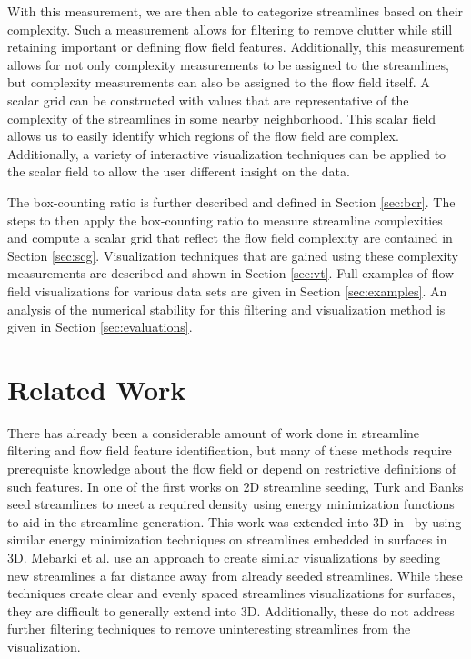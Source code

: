 \documentclass{egpubl}
\begin{document}
With this measurement, we are then able to categorize streamlines based on their complexity.
Such a measurement allows for filtering to remove clutter while still retaining important or defining flow field features.
Additionally, this measurement allows for not only complexity measurements to be assigned to the streamlines, but complexity measurements can also be assigned to the flow field itself.
A scalar grid can be constructed with values that are representative of the complexity of the streamlines in some nearby neighborhood.
This scalar field allows us to easily identify which regions of the flow field are complex.
Additionally, a variety of interactive visualization techniques can be applied to the scalar field to allow the user different insight on the data.

The box-counting ratio is further described and defined in Section \ref{sec:bcr}.
The steps to then apply the box-counting ratio to measure streamline complexities and compute a scalar grid that reflect the flow field complexity are contained in Section \ref{sec:scg}.
Visualization techniques that are gained using these complexity measurements are described and shown in Section \ref{sec:vt}.
Full examples of flow field visualizations for various data sets are given in Section \ref{sec:examples}.
An analysis of the numerical stability for this filtering and visualization method is given in Section \ref{sec:evaluations}.

\section{Related Work}

There has already been a considerable amount of work done in streamline filtering and flow field feature identification, but many of these methods require prerequiste knowledge about the flow field or depend on restrictive definitions of such features.
In one of the first works on 2D streamline seeding, Turk and Banks \cite{turk} seed streamlines to meet a required density using energy minimization functions to aid in the streamline generation.
This work was extended into 3D in~\cite{mao} by using similar energy minimization techniques on streamlines embedded in surfaces in 3D.
Mebarki et al. \cite{mebarki} use an approach to create similar visualizations by seeding new streamlines a far distance away from already seeded streamlines.
While these techniques create clear and evenly spaced streamlines visualizations for surfaces, they are difficult to generally extend into 3D.
Additionally, these do not address further filtering techniques to remove uninteresting streamlines from the visualization.
\end{document}
